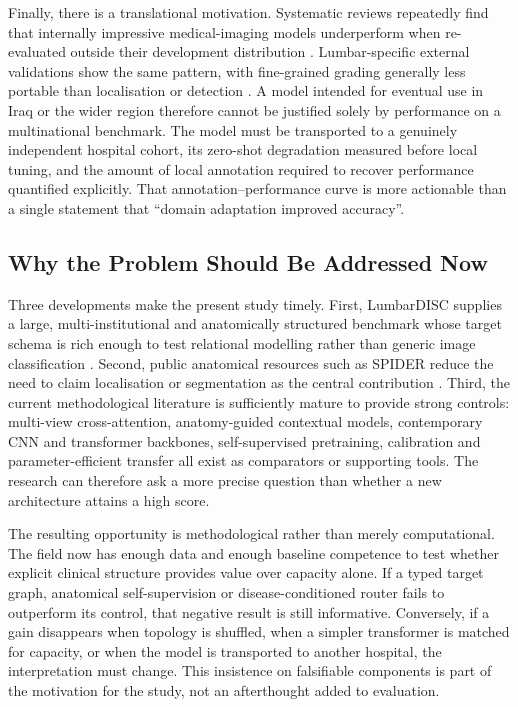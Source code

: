 Finally, there is a translational motivation. Systematic reviews repeatedly find
that internally impressive medical-imaging models underperform when re-evaluated
outside their development distribution \cite{compte2023are,wang2024machine}.
Lumbar-specific external validations show the same pattern, with fine-grained
grading generally less portable than localisation or detection
\cite{mcsweeney2023external,zhang2023deep}. A model intended for eventual use in
Iraq or the wider region therefore cannot be justified solely by performance on a
multinational benchmark. The model must be transported to a genuinely independent
hospital cohort, its zero-shot degradation measured before local tuning, and the
amount of local annotation required to recover performance quantified explicitly.
That annotation--performance curve is more actionable than a single statement that
``domain adaptation improved accuracy''.

\subsection{Why the Problem Should Be Addressed Now}
\label{sec:intro-why-now}

Three developments make the present study timely. First, LumbarDISC supplies a
large, multi-institutional and anatomically structured benchmark whose target schema
is rich enough to test relational modelling rather than generic image
classification \cite{richards2026the}. Second, public anatomical resources such as
SPIDER reduce the need to claim localisation or segmentation as the central
contribution \cite{vandergraaf2024lumbar}. Third, the current methodological
literature is sufficiently mature to provide strong controls: multi-view
cross-attention, anatomy-guided contextual models, contemporary CNN and transformer
backbones, self-supervised pretraining, calibration and parameter-efficient transfer
all exist as comparators or supporting tools. The research can therefore ask a more
precise question than whether a new architecture attains a high score.

The resulting opportunity is methodological rather than merely computational. The
field now has enough data and enough baseline competence to test whether explicit
clinical structure provides value over capacity alone. If a typed target graph,
anatomical self-supervision or disease-conditioned router fails to outperform its
control, that negative result is still informative. Conversely, if a gain disappears
when topology is shuffled, when a simpler transformer is matched for capacity, or
when the model is transported to another hospital, the interpretation must change.
This insistence on falsifiable components is part of the motivation for the study,
not an afterthought added to evaluation.

